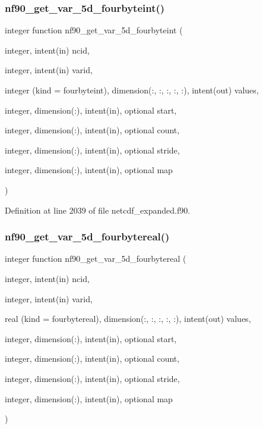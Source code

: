 \subsubsection{\texorpdfstring{nf90\+\_\+get\+\_\+var\+\_\+5d\+\_\+fourbyteint()}{nf90\_get\_var\_5d\_fourbyteint()}}
{\footnotesize\ttfamily integer function nf90\+\_\+get\+\_\+var\+\_\+5d\+\_\+fourbyteint (\begin{DoxyParamCaption}\item[{integer, intent(in)}]{ncid,  }\item[{integer, intent(in)}]{varid,  }\item[{integer (kind = fourbyteint), dimension(\+:, \+:, \+:, \+:, \+:), intent(out)}]{values,  }\item[{integer, dimension(\+:), intent(in), optional}]{start,  }\item[{integer, dimension(\+:), intent(in), optional}]{count,  }\item[{integer, dimension(\+:), intent(in), optional}]{stride,  }\item[{integer, dimension(\+:), intent(in), optional}]{map }\end{DoxyParamCaption})}



Definition at line 2039 of file netcdf\+\_\+expanded.\+f90.

\mbox{\label{netcdf__expanded_8f90_aa043d30c1a6946de0a1f3238599dc1ba}} 
\subsubsection{\texorpdfstring{nf90\+\_\+get\+\_\+var\+\_\+5d\+\_\+fourbytereal()}{nf90\_get\_var\_5d\_fourbytereal()}}
{\footnotesize\ttfamily integer function nf90\+\_\+get\+\_\+var\+\_\+5d\+\_\+fourbytereal (\begin{DoxyParamCaption}\item[{integer, intent(in)}]{ncid,  }\item[{integer, intent(in)}]{varid,  }\item[{real (kind = fourbytereal), dimension(\+:, \+:, \+:, \+:, \+:), intent(out)}]{values,  }\item[{integer, dimension(\+:), intent(in), optional}]{start,  }\item[{integer, dimension(\+:), intent(in), optional}]{count,  }\item[{integer, dimension(\+:), intent(in), optional}]{stride,  }\item[{integer, dimension(\+:), intent(in), optional}]{map }\end{DoxyParamCaption})}



